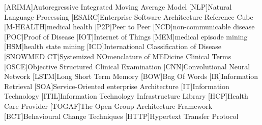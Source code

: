 \begin{acronym}[SNOWMED CT]
[ARIMA]{Autoregressive Integrated Moving Average Model}
[NLP]{Natural Language Processing}
[ESARC]{Enterprise Software Architecture Reference Cube}
[M-HEALTH]{medical health}
[P2P]{Peer to Peer}
[NCD]{non-communicable disease}
[POC]{Proof of Disease}
[IOT]{Internet of Things}
[MEM]{medical episode mining}
[HSM]{health state mining}
[ICD]{International Classification of Disease}
[SNOWMED CT]{Systemized NOmenclature of MEDicine Clinical Terms}
[OSCE]{Objective Structured Clinical Examination}
[CNN]{Convolutional Neural Network}
[LSTM]{Long Short Term Memory}
[BOW]{Bag Of Words}
[IR]{Information Retrieval}
[SOA]{Service-Oriented enterprise Architecture}
[IT]{Information Technology}
[ITIL]{Information Technology Infrastructure Library}
[HCP]{Health Care Provider}
[TOGAF]{The Open Group Architecture Framework}
[BCT]{Behavioural Change Techniques}
[HTTP]{Hypertext Transfer Protocol}
\end{acronym}